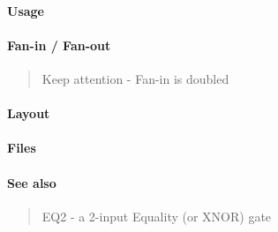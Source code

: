 \paragraph{Usage}

\paragraph{Fan-in / Fan-out}
\begin{quote}
    Keep attention - Fan-in is doubled
\end{quote}

\paragraph{Layout}

\paragraph{Files}

\paragraph{See also}
\begin{quote}
    EQ2 - a 2-input Equality (or XNOR) gate
\end{quote}
